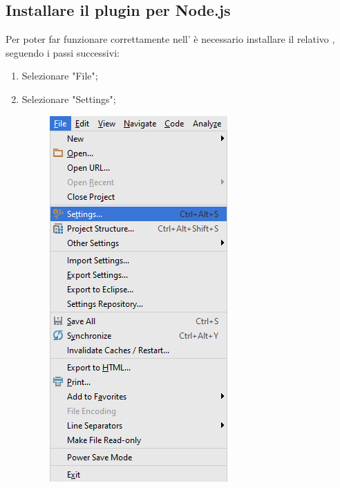 \documentclass[12pt,a4paper]{article}
\begin{document}
	\subsection{Installare il plugin per Node.js}
	Per poter far funzionare correttamente  nell' è necessario installare il relativo , seguendo i passi successivi:
	\begin{enumerate}
		\item Selezionare "File";
		\item Selezionare "Settings";

		\begin{center}
			\begin{figure}[H]
				\centering \includegraphics[max width=\textwidth]{../img/manualeSviluppatore/settings.png}

\end{figure}
\end{center}
\end{enumerate}
\end{document}
